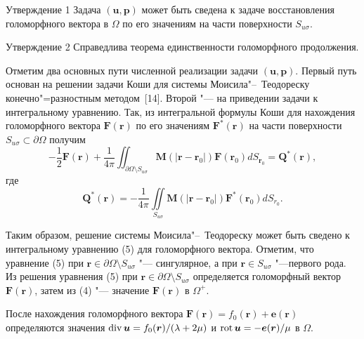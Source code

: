 \begin{newthm}{Утверждение 1}
 Задача $(\boldsymbol{u}, \boldsymbol{p})$ может быть сведена к задаче восстановления голоморфного вектора в $\Omega$ по его значениям на части поверхности $S_{u\sigma}$.
 \end{newthm}

\begin{newthm}{Утверждение 2}
Справедлива теорема единственности голоморфного продолжения.
 \end{newthm}

Отметим два основных пути численной реализации задачи $(\boldsymbol{u}, \boldsymbol{p})$.
Первый путь основан на решении задачи Коши для системы Моисила"--~Теодореску конечно"=разностным методом~[14]. 
Второй "--- на приведении задачи к интегральному уравнению. 
Так, из интегральной формулы Коши для нахождения голоморфного вектора $\boldsymbol{F}(\boldsymbol{r})$ по его значениям $\boldsymbol{F}^{*}(\boldsymbol{r})$ на части поверхности $S_{u\sigma}\subset\partial\Omega$ получим
\begin{equation}
-\frac{1}{2}\boldsymbol{F}(\boldsymbol{r})+\frac{1}{4\pi}
\iint_{\partial \Omega\setminus S_{u\sigma}} 
\boldsymbol M(|\boldsymbol{r}-\boldsymbol{r}_{0}|)
\boldsymbol{F}(\boldsymbol{r}_{0})dS_{\boldsymbol r_{0}}= \boldsymbol{Q^{*}}(\boldsymbol{r}),
\end{equation}
где
$$\boldsymbol{Q}^{*}(\boldsymbol{r})=-\frac{1}{4\pi}\iint\limits_{S_{u\sigma}}
\boldsymbol M(|\boldsymbol{r}-\boldsymbol{r}_{0}|)\boldsymbol{F}^{*}(\boldsymbol{r}_{0})dS_{r_{0}}.$$

Таким образом, решение системы Моисила"--~Теодореску
может быть сведено к интегральному уравнению (5) для голоморфного вектора.
Отметим, что уравнение (5) при $\boldsymbol r\in\partial\Omega \setminus S_{u\sigma}$ "--- сингулярное, а при $ \boldsymbol r\in S_{u\sigma}$ "---первого рода.
Из решения уравнения (5) при $\boldsymbol r\in\partial\Omega \setminus S_{u\sigma}$  определяется голоморфный вектор  $\boldsymbol{F}(\boldsymbol{r})$, затем из (4) "--- значение $\boldsymbol{F}(\boldsymbol{r})$  в $\Omega^{+}$.
 
После нахождения голоморфного вектора $\boldsymbol{F}(\boldsymbol{r})=f_{0}(\boldsymbol{r})+\boldsymbol{e}(\boldsymbol{r})$  определяются  значения $\mathop{\rm div} \boldsymbol{u}= f_{0}(\boldsymbol{r})/(\lambda+2\mu)$ и 
$\mathop{\rm rot}\boldsymbol{u}=-\boldsymbol{e}(\boldsymbol{r})/\mu$ в $\Omega $.

